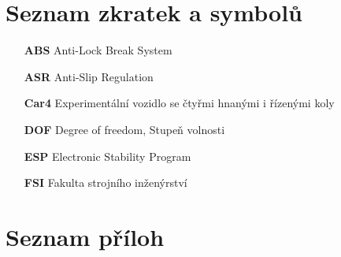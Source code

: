 \chapter*{Seznam zkratek a symbolů}
\label{chap:loa}
\begin{itemize}
	\item[\textbf{ABS}] Anti-Lock Break System
	
	\item[\textbf{ASR}] Anti-Slip Regulation
	
	\item[\textbf{Car4}] Experimentální vozidlo se čtyřmi hnanými i řízenými koly
	
	\item[\textbf{DOF}] Degree of freedom, Stupeň volnosti
	
	\item[\textbf{ESP}] Electronic Stability Program
	
	\item[\textbf{FSI}] Fakulta strojního inženýrství
\end{itemize}

\chapter*{Seznam příloh}